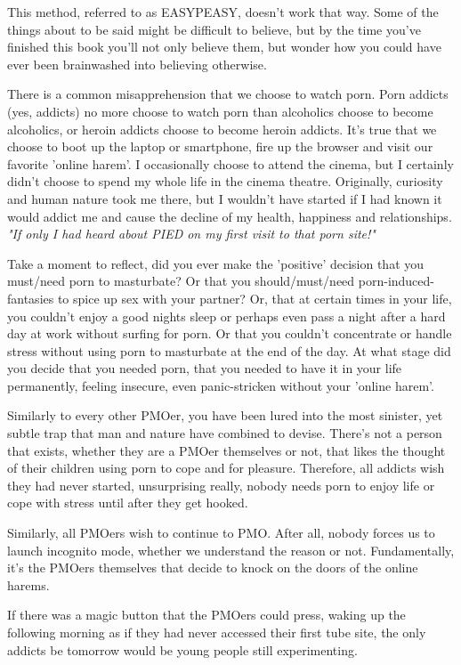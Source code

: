\documentclass[easypeasy.tex]{subfiles}
\begin{document}
This method, referred to as EASYPEASY, doesn't work that way. Some of the things about to be said might be difficult to believe, but by the time you've finished this book you'll not only believe them, but wonder how you could have ever been brainwashed into believing otherwise.

There is a common misapprehension that we choose to watch porn. Porn addicts (yes, addicts) no more choose to watch porn than alcoholics choose to become alcoholics, or heroin addicts choose to become heroin addicts. It's true that we choose to boot up the laptop or smartphone, fire up the browser and visit our favorite 'online harem'. I occasionally choose to attend the cinema, but I certainly didn't choose to spend my whole life in the cinema theatre. Originally, curiosity and human nature took me there, but I wouldn't have started if I had known it would addict me and cause the decline of my health, happiness and relationships.
\textit{"If only I had heard about PIED on my first visit to that porn site!"}

Take a moment to reflect, did you ever make the 'positive' decision that you must/need porn to masturbate? Or that you should/must/need porn-induced-fantasies to spice up sex with your partner? Or, that at certain times in your life, you couldn't enjoy a good nights sleep or perhaps even pass a night after a hard day at work without surfing for porn. Or that you couldn't concentrate or handle stress without using porn to masturbate at the end of the day. At what stage did you decide that you needed porn, that you needed to have it in your life permanently, feeling insecure, even panic-stricken without  your 'online harem'.

Similarly to every other PMOer, you have been lured into the most sinister, yet subtle trap that man and nature have combined to devise. There's not a person that exists, whether they are a PMOer themselves or not, that likes the thought of their children using porn to cope and for pleasure. Therefore, all addicts wish they had never started, unsurprising really, nobody needs porn to enjoy life or cope with stress until after they get hooked.

Similarly, all PMOers wish to continue to PMO. After all, nobody forces us to launch incognito mode, whether we understand the reason or not. Fundamentally, it's the PMOers themselves that decide to knock on the doors of the online harems.

If there was a magic button that the PMOers could press, waking up the following morning as if they had never accessed their first tube site, the only addicts be tomorrow would be young people still experimenting.
\end{document}
